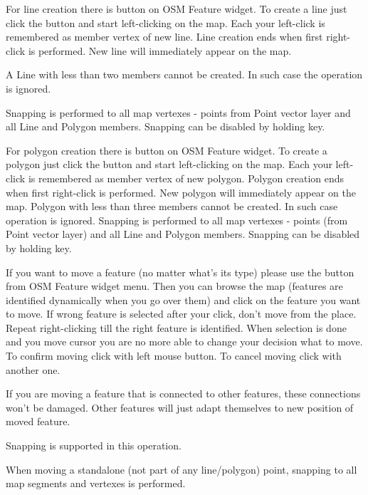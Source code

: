 For line creation there is  button 
on OSM Feature widget. To create a line just click the button and start 
left-clicking on the map. Each your left-click is remembered as member 
vertex of new line. Line creation ends when first right-click is performed. 
New line will immediately appear on the map.

A Line with less than two members cannot be created. In such case the 
operation is ignored.

Snapping is performed to all map vertexes - points from Point vector layer
and all Line and Polygon members. Snapping can be disabled by holding 
 key.


For polygon creation there is  
button on OSM Feature widget. To create a polygon just click the button 
and start left-clicking on the map. Each your left-click is remembered as 
member vertex of new polygon. Polygon creation ends when first right-click 
is performed. New polygon will immediately appear on the map.
Polygon with less than three members cannot be created. In such case
operation is ignored. Snapping is performed to all map vertexes - points 
(from Point vector layer) and all Line and Polygon members. Snapping can be 
disabled by holding  key.


If you want to move a feature (no matter what's its type) please use the
 button from OSM Feature widget menu. 
Then you can browse the map (features are identified dynamically when you 
go over them) and click on the feature you want to move. If wrong feature is
selected after your click, don't move from the place. Repeat right-clicking
till the right feature is identified. When selection is done and you move
cursor you are no more able to change your decision what to move.
To confirm moving click with left mouse button. To cancel moving click 
with another one.

If you are moving a feature that is connected to other features, these
connections won't be damaged. Other features will just adapt themselves to
new position of moved feature.

Snapping is supported in this operation.

When moving a standalone (not part of any line/polygon) point, snapping to
all map segments and vertexes is performed.

